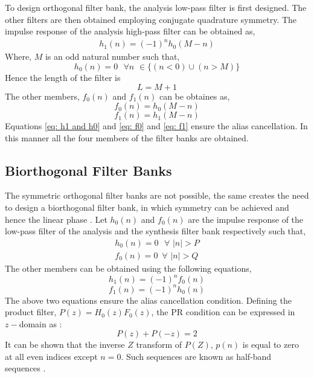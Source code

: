 To design orthogonal filter bank, the analysis low-pass filter is first designed. The other filters are then obtained employing conjugate quadrature symmetry. The impulse response of the analysis high-pass filter can be obtained as,
\begin{eqnarray}
\label{eq: h1 and h0}
h_1(n) = (-1)^nh_0(M-n)
\end{eqnarray} 
Where, $M$ is an odd natural number such that,
$$ h_0(n) = 0\,\,\,\, \forall n\,\, \in \{(n<0)\cup(n>M)\}$$
Hence the length of the filter is
$$ L = M + 1$$
The other members, $f_0(n)$ and $f_1(n)$ can be obtaines as,
\begin{equation}
\label{eq: f0}
f_0(n)=h_0(M-n)
\end{equation}
\begin{equation}
\label{eq: f1}
f_1(n)=h_1(M-n)
\end{equation}
Equations \ref{eq: h1 and h0} and \ref{eq: f0} and \ref{eq: f1} ensure the alias cancellation. In this manner all the four members of the filter banks are obtained.

\subsection{Biorthogonal Filter Banks}
 The symmetric orthogonal filter banks are not possible, the same creates the need to design a biorthogonal filter bank, in which symmetry can be achieved and hence the linear phase \cite{strang}. 
Let $h_0(n)$ and $f_0(n)$ are the impulse response of the low-pass filter of the analysis and the synthesis filter bank respectively such that,
\begin{eqnarray}
\label{eq: bior ana. filt.}
h_0(n) = 0\,\,\,\, \forall\,\, |n| > P\\
f_0(n) = 0 \,\,\, \forall\,\, |n| > Q 
\end{eqnarray}  
The other members can be obtained using the following equations,
\begin{equation}
\label{eq: h1 bior}
h_1(n) = (-1)^nf_0(n)
\end{equation}
\begin{equation}
\label{eq: f1 bior}
f_1(n) = (-1)^nh_0(n)
\end{equation}
The above two equations ensure the alias cancellation condition. Defining the product filter, $P(z)=H_{0}(z)F_{0}(z)$, the PR condition can be expressed in $z-$domain as :
\begin{equation}
P(z)+P(-z)=2\label{eq:halfband cond}
\end{equation}
It can be shown that the inverse $Z$ transform of $P(Z)$, $p(n)$ is equal to zero at all even indices except $n=0$.
Such sequences are known as half-band sequences \cite{key-1}.


